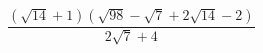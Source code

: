 \begin{ex}[type=calculate]
	\begin{condition}
		\( \dfrac{(\sqrt{14}+1)(\sqrt{98}-\sqrt{7}+2\sqrt{14}-2)}{2\sqrt{7}+4} \)
	\end{condition}
\end{ex}